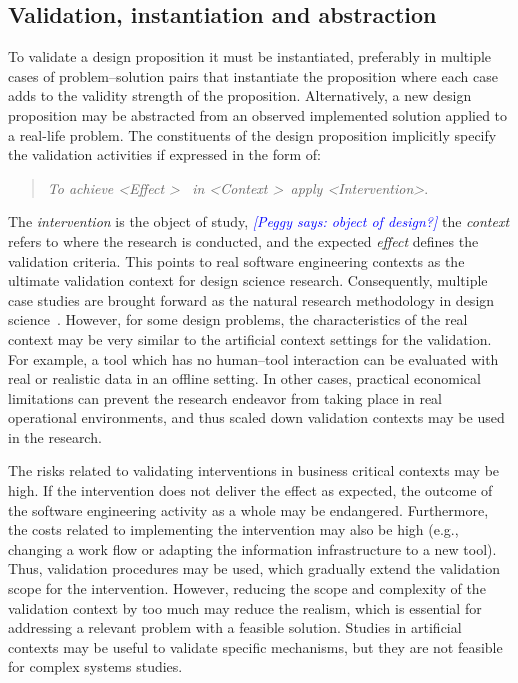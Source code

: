 \documentclass[graybox]{svmult}
\newcommand{\peggy}[1]{\textcolor{blue}{{\it [Peggy says: #1]}}}
\newcommand{\peggy}[1]{}
\begin{document}
 

\subsection{Validation, instantiation and abstraction}

To validate a design proposition it must be instantiated, preferably in multiple cases of problem--solution pairs that instantiate the proposition where each case adds to the validity strength of the proposition. Alternatively, a new design proposition may be abstracted from an observed implemented solution applied to a real-life problem.
The constituents of the design proposition implicitly specify the validation activities if expressed in the form of:

\begin{quote}{\emph{To achieve \textless Effect \textgreater ~ in \textless Context \textgreater~apply \textless Intervention\textgreater}.} 
\end{quote} 
The \emph{intervention} is the object of study,
\peggy{object of design?}
 the \emph{context}  refers to where the research is conducted, and the expected \emph{effect} defines the validation criteria. This points to real software engineering contexts as the ultimate validation context for design science research. 
Consequently, multiple case studies are brought forward as the natural research methodology in design science~\cite{van_aken_management_2004}. However, for some design problems, the characteristics of the real context may be very similar to the artificial context settings for the validation. For example, a tool which has no human--tool interaction can be evaluated with real or realistic data in an offline setting. In other cases, practical economical limitations can prevent the research endeavor from taking place in real operational environments, and thus scaled down validation contexts may be used in the research. 


The risks related to validating interventions in business critical contexts may be high. If the intervention does not deliver the effect as expected, the outcome of the software engineering activity as a whole may be endangered. Furthermore, the costs related to implementing the intervention may also be high (e.g., changing a work flow or adapting the information infrastructure to a new tool). Thus, validation procedures may be used, which gradually extend the validation scope for the intervention.
However, reducing the scope and complexity of the validation context by too much may reduce the realism, which is essential for addressing a relevant problem with a feasible solution. Studies in artificial contexts may be useful to validate specific mechanisms, but they are not feasible for complex systems studies.  
\end{document}
